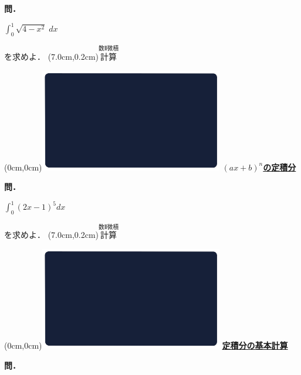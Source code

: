 \documentclass[10pt,
fleqn,
dvipdfmx,
uplatex
]{jsarticle}
\begin{document}
\large
\bf\boldmath 問．

\Huge 
\vspace{-0.2zw}
\hspace{0.5zw}$\displaystyle\int_0^1\sqrt {4-x^2}\;dx$
\vspace{-0.2zw}

\large
\hfill 
を求めよ．
\at(7.0cm,0.2cm){\small\color{bradorange}$\overset{\text{数Ⅱ微積}}{\text{計算}}$}

\newpage

\at(0cm,0cm){\includegraphics[width=8cm,bb=0 0 1920 1080]{./youtube/thumbnails/templates/smart_background/数II微積.jpeg}}
{\color{orange}\bf\boldmath\LARGE\underline{$\left(ax+b\right)^n$の定積分}}\vspace{0.3zw}

\large 
\bf\boldmath 問．

\Huge 
\vspace{-0.2zw}
\hspace{0.5zw}$\displaystyle\int_0^1\left(2x-1\right)^5dx$
\vspace{-0.2zw}

\large 
\hfill を求めよ．
\at(7.0cm,0.2cm){\small\color{bradorange}$\overset{\text{数Ⅱ微積}}{\text{計算}}$}

\newpage

\at(0cm,0cm){\includegraphics[width=8cm,bb=0 0 1920 1080]{./youtube/thumbnails/templates/smart_background/数II微積.jpeg}}
{\color{orange}\bf\boldmath\LARGE\underline{定積分の基本計算}}\vspace{0.3zw}

\large 
\bf\boldmath 問．
\end{document}
